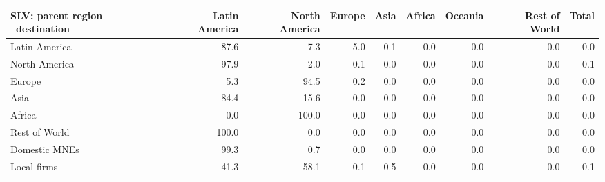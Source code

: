 \begin{tabular}{lrrrrrrrr}
\toprule
SLV: parent region \ destination & Latin America & North America & Europe & Asia & Africa & Oceania & Rest of World & Total \\
\midrule
Latin America & 87.6 & 7.3 & 5.0 & 0.1 & 0.0 & 0.0 & 0.0 & 0.0 \\
North America & 97.9 & 2.0 & 0.1 & 0.0 & 0.0 & 0.0 & 0.0 & 0.1 \\
Europe & 5.3 & 94.5 & 0.2 & 0.0 & 0.0 & 0.0 & 0.0 & 0.0 \\
Asia & 84.4 & 15.6 & 0.0 & 0.0 & 0.0 & 0.0 & 0.0 & 0.0 \\
Africa & 0.0 & 100.0 & 0.0 & 0.0 & 0.0 & 0.0 & 0.0 & 0.0 \\
Rest of World & 100.0 & 0.0 & 0.0 & 0.0 & 0.0 & 0.0 & 0.0 & 0.0 \\
Domestic MNEs & 99.3 & 0.7 & 0.0 & 0.0 & 0.0 & 0.0 & 0.0 & 0.0 \\
Local firms & 41.3 & 58.1 & 0.1 & 0.5 & 0.0 & 0.0 & 0.0 & 0.1 \\
\bottomrule
\end{tabular}
